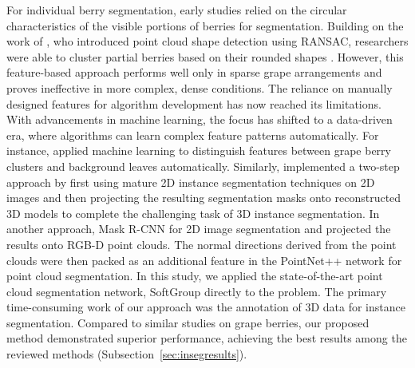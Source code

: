 \documentclass[12pt]{article}
\begin{document}
For individual berry segmentation, early studies relied on the circular characteristics of the visible portions of berries for segmentation.
Building on the work of \citet{schnabel_efficient_2007}, who introduced point cloud shape detection using RANSAC, researchers were able to cluster partial berries based on their rounded shapes \citep{scholer_automated_2015, rist_highprecision_2018, schneider_predicting_2020}.
However, this feature-based approach performs well only in sparse grape arrangements and proves ineffective in more complex, dense conditions.
The reliance on manually designed features for algorithm development has now reached its limitations.
With advancements in machine learning, the focus has shifted to a data-driven era, where algorithms can learn complex feature patterns automatically.
For instance, \citet{rose_automated_2016} applied machine learning to distinguish features between grape berry clusters and background leaves automatically.
Similarly, \citet{ni_threedimensional_2021} implemented a two-step approach by first using mature 2D instance segmentation techniques on 2D images and then projecting the resulting segmentation masks onto reconstructed 3D models to complete the challenging task of 3D instance segmentation.
In another approach, \citet{luo_3d_2023} Mask R-CNN for 2D image segmentation and projected the results onto RGB-D point clouds.
The normal directions derived from the point clouds were then packed as an additional feature in the PointNet++ network for point cloud segmentation.
In this study, we applied the state-of-the-art point cloud segmentation network, SoftGroup \citep{vu_softgroup_2022} directly to the problem.
The primary time-consuming work of our approach was the annotation of 3D data for instance segmentation.
Compared to similar studies on grape berries, our proposed method demonstrated superior performance, achieving the best results among the reviewed methods (Subsection~\ref{sec:insegresults}).
\end{document}
